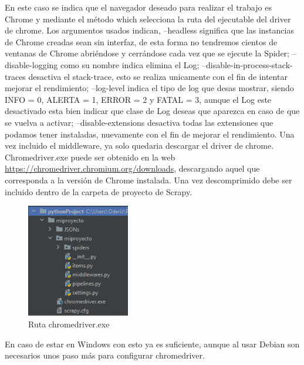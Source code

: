 En este caso se indica que el navegador deseado para realizar el trabajo es Chrome y mediante el método which selecciona la ruta del ejecutable del driver de chrome.\newline
\newline
Los argumentos usados indican, --headless significa que las instancias de Chrome creadas sean sin interfaz, de esta forma no tendremos cientos de ventanas de Chrome abriéndose y cerrándose cada vez que se ejecute la Spider; --disable-logging como su nombre indica elimina el Log; --disable-in-process-stack-traces desactiva el stack-trace, esto se realiza unicamente con el fin de intentar mejorar el rendimiento; --log-level indica el tipo de log que desas mostrar, siendo INFO = 0, ALERTA = 1, ERROR = 2 y FATAL = 3, aunque el Log este desactivado esta bien indicar que clase de Log deseas que aparezca en caso de que se vuelva a activar; --disable-extensions desactiva todas las extensiones que podamos tener instaladas, nuevamente con el fin de mejorar el rendimiento.\newline
\newline
Una vez incluido el middleware, ya solo quedaria descargar el driver de chrome.\newline
\newline
Chromedriver.exe puede ser obtenido en la web \url{https://chromedriver.chromium.org/downloads}, descargando aquel que corresponda a la versión de Chrome instalada. Una vez descomprimido debe ser incluido dentro de la carpeta de proyecto de Scrapy.

\begin{figure} [h!]
	\centering
	\includegraphics[width=0.4\textwidth]{fig/chromedriver.png}
	\caption[Ruta chromedriver.exe]{Ruta chromedriver.exe}
	\label{fig:ej15}
\end{figure}

En caso de estar en Windows con esto ya es suficiente, aunque al usar Debian son necesarios unos paso más para configurar chromedriver.

